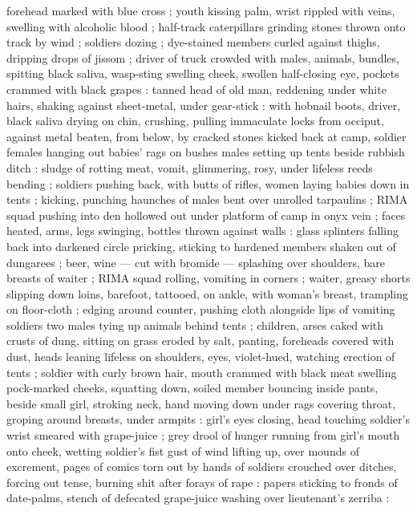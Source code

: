 forehead marked with blue cross ; youth kissing palm, wrist rippled with veins, swelling with
alcoholic blood ; half-track caterpillars grinding stones thrown onto track by wind ; soldiers
dozing ; dye-stained members curled against thighs, dripping drops of jissom ; driver of truck
crowded with males, animals, bundles, spitting black saliva, wasp-sting swelling cheek, swollen
half-closing eye, pockets crammed with black grapes : tanned head of old man, reddening under white
hairs, shaking against sheet-metal, under gear-stick : with hobnail boots, driver, black saliva
drying on chin, crushing, pulling immaculate locks from occiput, against metal beaten, from below,
by cracked stones kicked back {\semislash} at camp, soldier 
{\semislash} females hanging out babies' rags on bushes {\semislash} males setting up tents beside
rubbish ditch : sludge of rotting meat, vomit, glimmering, rosy, under lifeless reeds bending ;
soldiers pushing back, with butts of rifles, women laying babies down in tents ; kicking, punching
haunches of males bent over unrolled tarpaulins ; RIMA squad pushing into den hollowed out under
platform of camp in onyx vein ; faces heated, arms, legs swinging, bottles thrown against walls :
glass splinters falling back into darkened circle pricking, sticking to hardened members shaken out
of dungarees ; beer, wine --- cut with bromide %
--- splashing over shoulders, bare breasts of waiter ; RIMA squad rolling, vomiting in corners ;
waiter, greasy shorts slipping down loins, barefoot, tattooed, on ankle, with woman's breast,
trampling on floor-cloth ; edging around counter, pushing cloth alongside lips of vomiting soldiers
{\semislash} two males tying up animals behind tents ; children, arses caked with crusts of dung,
sitting on grass eroded by salt, panting, foreheads covered with dust, heads leaning lifeless on
shoulders, eyes, violet-hued, watching erection of tents ; soldier with curly brown hair, mouth
crammed with black meat swelling pock-marked cheeks, squatting down, soiled member bouncing inside
pants, beside small girl, stroking neck, hand moving down under rags covering throat, groping around
breasts, under armpits : girl's eyes closing, head touching soldier's wrist smeared with grape-juice
; grey drool of hunger running from girl's mouth onto cheek, wetting soldier's fist {\semislash}
gust of wind lifting up, over mounds of excrement, pages of comics torn out by hands of soldiers
crouched over ditches, forcing out tense, burning shit after forays of rape : papers sticking to
fronds of date-palms, stench of defecated grape-juice washing over lieutenant's zerriba :
